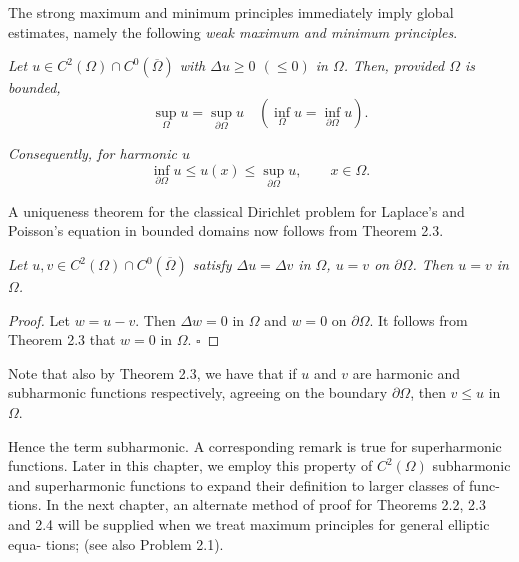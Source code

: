 \medskip

The strong maximum and minimum principles immediately imply global estimates, namely the following \emph{weak maximum and minimum principles}.

\medskip

\begin{theorem}\label{gt.thm2.3}
\emph{Let $u \in C^2(\Omega)\cap C^0(\overline{\Omega})$ with $\Delta u \geq 0$ $(\leq 0)$ in $\Omega$. Then, provided $\Omega$ is bounded,}
\begin{equation}
\tag{2.7}
\sup_{\Omega} u=\sup_{\partial\Omega} u \quad \left(\inf_{\Omega} u=\inf_{\partial\Omega} u\right).
\end{equation}

\medskip

\noindent\emph{Consequently, for harmonic $u$}
\[
\inf_{\partial\Omega} u\leq u(x)\leq \sup_{\partial\Omega} u, \qquad x\in\Omega.
\]
\end{theorem}

\medskip

A uniqueness theorem for the classical Dirichlet problem for Laplace's and Poisson's equation in bounded domains now follows from Theorem 2.3.

\medskip

\begin{theorem}\label{gt.thm2.4}
\emph{Let $u, v \in C^2(\Omega)\cap C^0(\overline{\Omega})$ satisfy $\Delta u=\Delta v$ in $\Omega$, $u=v$ on $\partial\Omega$. Then $u=v$ in $\Omega$.}

\medskip

\begin{proof}
Let $w=u-v$. Then $\Delta w=0$ in $\Omega$ and $w=0$ on $\partial\Omega$. It follows from Theorem 2.3 that $w=0$ in $\Omega$. \hfill $\square$
\end{proof}
\end{theorem}

\medskip

\noindent Note that also by Theorem 2.3, we have that if $u$ and $v$ are harmonic and subharmonic functions respectively, agreeing on the boundary $\partial\Omega$, then $v\leq u$ in $\Omega$.




\noindent Hence the term subharmonic. A corresponding remark is true for superharmonic
functions. Later in this chapter, we employ this property of $C^2(\Omega)$ subharmonic
and superharmonic functions to expand their definition to larger classes of func-
tions. In the next chapter, an alternate method of proof for Theorems 2.2, 2.3 and
2.4 will be supplied when we treat maximum principles for general elliptic equa-
tions; (see also Problem 2.1).

